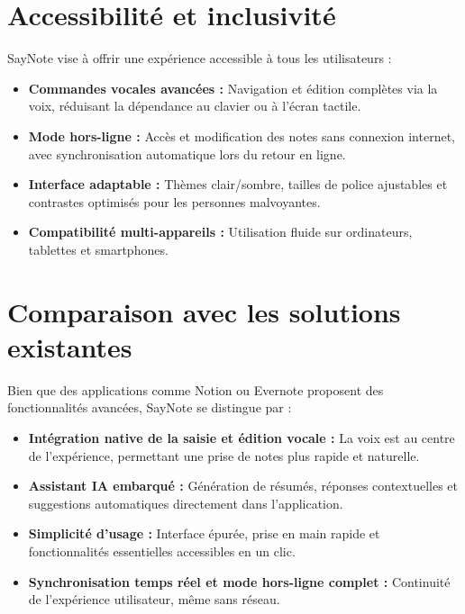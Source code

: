 \section{Accessibilité et inclusivité}
SayNote vise à offrir une expérience accessible à tous les utilisateurs :
\begin{itemize}
    \item \textbf{Commandes vocales avancées :} Navigation et édition complètes via la voix, réduisant la dépendance au clavier ou à l’écran tactile.
    \item \textbf{Mode hors-ligne :} Accès et modification des notes sans connexion internet, avec synchronisation automatique lors du retour en ligne.
    \item \textbf{Interface adaptable :} Thèmes clair/sombre, tailles de police ajustables et contrastes optimisés pour les personnes malvoyantes.
    \item \textbf{Compatibilité multi-appareils :} Utilisation fluide sur ordinateurs, tablettes et smartphones.
\end{itemize}

\section{Comparaison avec les solutions existantes}
Bien que des applications comme Notion ou Evernote proposent des fonctionnalités avancées, SayNote se distingue par :
\begin{itemize}
    \item \textbf{Intégration native de la saisie et édition vocale :} La voix est au centre de l’expérience, permettant une prise de notes plus rapide et naturelle.
    \item \textbf{Assistant IA embarqué :} Génération de résumés, réponses contextuelles et suggestions automatiques directement dans l’application.
    \item \textbf{Simplicité d’usage :} Interface épurée, prise en main rapide et fonctionnalités essentielles accessibles en un clic.
    \item \textbf{Synchronisation temps réel et mode hors-ligne complet :} Continuité de l’expérience utilisateur, même sans réseau.
\end{itemize}

